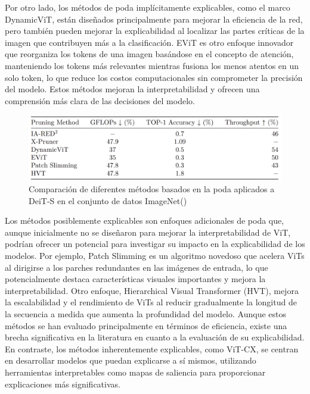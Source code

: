 Por otro lado, los métodos de poda implícitamente explicables, como el marco DynamicViT, están diseñados principalmente para mejorar la eficiencia de la red, pero también pueden mejorar la explicabilidad al localizar las partes críticas de la imagen que contribuyen más a la clasificación. EViT es otro enfoque innovador que reorganiza los tokens de una imagen basándose en el concepto de atención, manteniendo los tokens más relevantes mientras fusiona los menos atentos en un solo token, lo que reduce los costos computacionales sin comprometer la precisión del modelo. Estos métodos mejoran la interpretabilidad y ofrecen una comprensión más clara de las decisiones del modelo.   

   \begin{figure}[H]
	\begin{center}
		\includegraphics[width=1\textwidth]{2/figures/vt5.jpeg}
		\caption{Comparación de diferentes métodos basados en la poda aplicados a DeiT-S en el conjunto de datos ImageNet(\cite{tecnica1})}
	\end{center}
\end{figure}


Los métodos posiblemente explicables son enfoques adicionales de poda que, aunque inicialmente no se diseñaron para mejorar la interpretabilidad de ViT, podrían ofrecer un potencial para investigar su impacto en la explicabilidad de los modelos. Por ejemplo, Patch Slimming es un algoritmo novedoso que acelera ViTs al dirigirse a los parches redundantes en las imágenes de entrada, lo que potencialmente destaca características visuales importantes y mejora la interpretabilidad. Otro enfoque, Hierarchical Visual Transformer (HVT), mejora la escalabilidad y el rendimiento de ViTs al reducir gradualmente la longitud de la secuencia a medida que aumenta la profundidad del modelo. Aunque estos métodos se han evaluado principalmente en términos de eficiencia, existe una brecha significativa en la literatura en cuanto a la evaluación de su explicabilidad. En contraste, los métodos inherentemente explicables, como ViT-CX, se centran en desarrollar modelos que puedan explicarse a sí mismos, utilizando herramientas interpretables como mapas de saliencia para proporcionar explicaciones más significativas.

